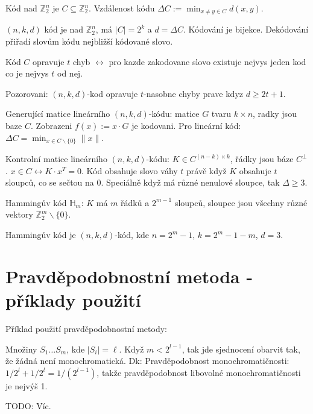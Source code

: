 \documentclass[a4paper,10pt,titlepage]{article} \usepackage[utf8]{inputenc}
\def\Z{\mathbb{Z}}
\begin{document}
Kód nad $\Z_2^n$ je $C\subseteq\Z_2^n$. Vzdálenost kódu $\Delta C:=\min_{x\neq
y\in C} d(x,y)$.

$(n,k,d)$ kód je nad $\Z_2^n$, má $|C|=2^k$ a $d=\Delta C$.
Kódování je bijekce. Dekódování přiřadí slovům kódu nejbližší kódované slovo.

Kód $C$ opravuje $t$ chyb $\leftrightarrow$ pro kazde zakodovane slovo
existuje nejvys jeden kod co je nejvys $t$ od nej.

Pozorovani: $(n,k,d)$-kod opravuje $t$-nasobne chyby prave kdyz $d\geq 2t+1$.

Generující matice lineárního $(n,k,d)$-kódu: matice $G$ tvaru $k\times n$,
radky jsou baze $C$. Zobrazeni $f(x):=x\cdot G$ je kodovani.
Pro lineární kód: $\Delta C=\min_{x\in C\smallsetminus\{0\}}\|x\|$.

Kontrolní matice lineárního $(n,k,d)$-kódu: $K\in C^{(n-k)\times k}$, řádky
jsou báze $C^\perp$. $x\in C\leftrightarrow K\cdot x^T=0$. Kód obsahuje slovo
váhy $t$ právě když $K$ obsahuje $t$ sloupců, co se sečtou na 0.
Speciálně když má různé nenulové sloupce, tak $\Delta\geq 3$.

Hammingův kód $\mathbb{H}_m$: $K$ má $m$ řádků a $2^{m-1}$ sloupců,
sloupce jsou všechny různé vektory $\Z_2^m\smallsetminus\{0\}$.

Hammingův kód je $(n,k,d)$-kód, kde $n=2^m-1$, $k=2^m-1-m$, $d=3$.

\section{Pravděpodobnostní metoda - příklady použití}
\vykradeno

Příklad použití pravděpodobnostní metody:

Množiny $S_1\ldots S_m$, kde $|S_i|=\ell$. Když $m<2^{l-1}$, tak jde sjednocení
obarvit tak, že žádná není monochromatická.
Dk: Pravděpodobnost monochromatičnosti: $1/2^l + 1/2^l = 1/(2^{l-1})$,
takže pravděpodobnost libovolné monochromatičnosti je nejvýš 1.

TODO: Víc.
\end{document}
